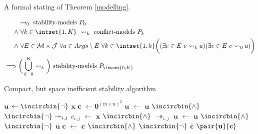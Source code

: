 A formal stating of Theorem \ref{modelling}.

\begin{align*}
&\rightsquigarrow_0\text{ stability-models }P_0\\
\land&\ \forall k\in\intset{1,K}\ \rightsquigarrow_k\text{ conflict-models }P_k\\
\land&\ \forall E\in\mathcal{M}\times\mathcal{J}\ \forall a\in Args\setminus E\ \forall k\in\intset{1,k}\bigg((\exists e\in E\ e\rightsquigarrow_k a)(\exists e\in E\ e\rightsquigarrow_0 a)\bigg)\\
\implies&\bigg(\bigcup_{k=0}^K\rightsquigarrow_k\bigg)\text{ stability-models }P_{\intset{0,K}}
\end{align*}

\begin{algorithm}[H]
	\caption{Compact, but space inefficient stability algorithm}
	\begin{algorithmic}[1]
		\State $\mathbf{u}$ $\gets\incircbin{\neg}$ $\mathbf{x}$
		\State $\mathbf{c}$ $\gets\mathbf{0}^{(m\times n)^2}$
		\State $\mathbf{u}$ $\gets$ $\mathbf{u}$ $\incircbin{\land}$ $\incircbin{\neg}\twoheadrightarrow_{i,j}$
		\State $c_{i,j}$ $\gets$ $\mathbf{x}$ $\incircbin{\land}$ $\twoheadrightarrow_{i,j}$ 
		\EndIf
		\EndFor			
		\State $\mathbf{u}$ $\gets$ $\mathbf{u}$ $\incircbin{\land}$ $\incircbin{\neg}$ $\bar{\mathbf{u}}$
		\State $\mathbf{c}$ $\gets$ $\mathbf{c}$ $\incircbin{\land}$ $\incircbin{\neg}$ $\bar{\mathbf{c}}$
		\State \Return $\pair{\mathbf{u}}{\mathbf{c}}$
		\EndFunction
	\end{algorithmic}
\end{algorithm}